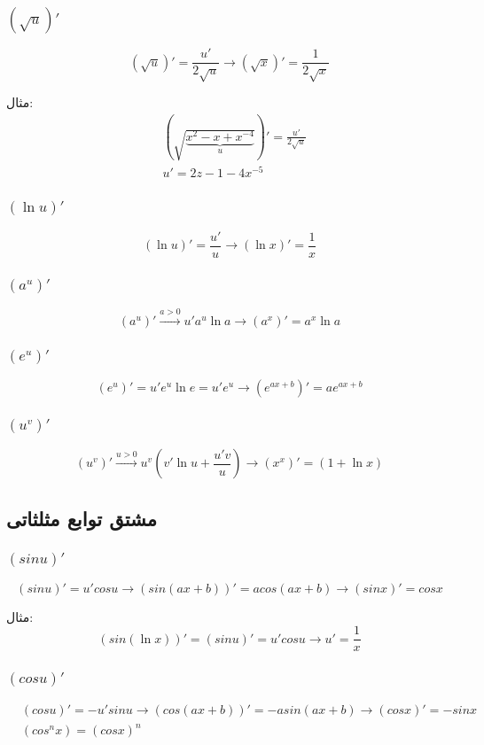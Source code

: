 \subsubsection{$(\sqrt{u})'$}
\[ (\sqrt{u})' = \frac{u'}{2\sqrt{u}} \to (\sqrt{x})' = \frac{1}{2\sqrt{x}} \]

مثال:
\begin{align*}
&(\sqrt{\underbrace{x^2-x+x^{-4}}_u})' = \frac{u'}{2\sqrt{u}} \\
&u' = 2z-1-4x^{-5}
\end{align*}

\subsubsection{$(\ln u)'$}
\[ (\ln u)' = \frac{u'}{u} \to (\ln x)' = \frac{1}{x} \]

\subsubsection{$(a^u)'$}
\[ (a^u)' \overset{a>0}{\longrightarrow} u'a^u\ln a \to (a^x)' = a^x\ln a \]

\subsubsection{$(e^u)'$}
\[ (e^u)' = u'e^u\ln e = u'e^u \to (e^{ax+b})' = ae^{ax+b} \]

\subsubsection{$(u^v)'$}
\[ (u^v)' \overset{u>0}{\longrightarrow} u^v(v'\ln u+\frac{u'v}{u}) \to (x^x)' = (1 + \ln x) \]


\subsection{مشتق توابع مثلثاتی}
\subsubsection{$(sin u)'$}
\[ (sin u)' = u'cos u \longrightarrow (sin(ax+b))' = a cos(ax+b) \longrightarrow (sin x)' = cos x \]

مثال:
\[ (sin(\ln x))' = (sin u)' = u'cosu \to u' = \frac{1}{x}\]

\subsubsection{$(cos u)'$}
\begin{align*}
&(cos u)' = -u'sin u \longrightarrow (cos(ax+b))' = -asin(ax+b) \to (cos x)' = -sin x \\
&(cos^n x) = (cos x)^n \\
\end{align*}

